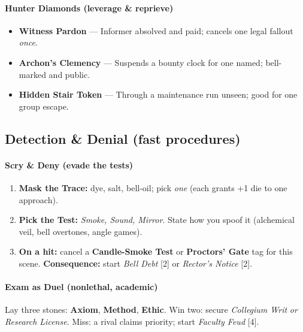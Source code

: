 \paragraph{Hunter Diamonds (leverage \& reprieve)}
\begin{itemize}
  \item \textbf{Witness Pardon} — Informer absolved and paid; cancels one legal fallout \emph{once}.
  \item \textbf{Archon’s Clemency} — Suspends a bounty clock for one named; bell-marked and public.
  \item \textbf{Hidden Stair Token} — Through a maintenance run unseen; good for one group escape.
\end{itemize}

\subsection*{Detection \& Denial (fast procedures)}
\label{sec:thepyrgos-detect}
\paragraph{Scry \& Deny (evade the tests)}
\begin{enumerate}
  \item \textbf{Mask the Trace:} dye, salt, bell-oil; pick \emph{one} (each grants +1 die to one approach).
  \item \textbf{Pick the Test:} \emph{Smoke, Sound, Mirror}. State how you spoof it (alchemical veil, bell overtones, angle games).
  \item \textbf{On a hit:} cancel a \textbf{Candle-Smoke Test} or \textbf{Proctors’ Gate} tag for this scene. \textbf{Consequence:} start \emph{Bell Debt} [2] or \emph{Rector’s Notice} [2].
\end{enumerate}

\paragraph{Exam as Duel (nonlethal, academic)}
Lay three stones: \textbf{Axiom}, \textbf{Method}, \textbf{Ethic}.  
Win two: secure \emph{Collegium Writ} \emph{or} \emph{Research License}.  
Miss: a rival claims priority; start \emph{Faculty Feud} [4].

